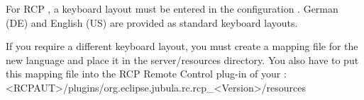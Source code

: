 
For RCP \gdauts{}, a keyboard layout must be entered in the \gdaut{} configuration . German (DE) and English (US) are provided as standard keyboard layouts. 

If you require a different keyboard layout, you must create a mapping file for the new language and place it in the server/resources directory. You also have to put this mapping file into the RCP Remote Control plug-in of your \gdaut{}:\\


<RCPAUT>/plugins/org.eclipse.jubula.rc.rcp\_<Version>/resources


